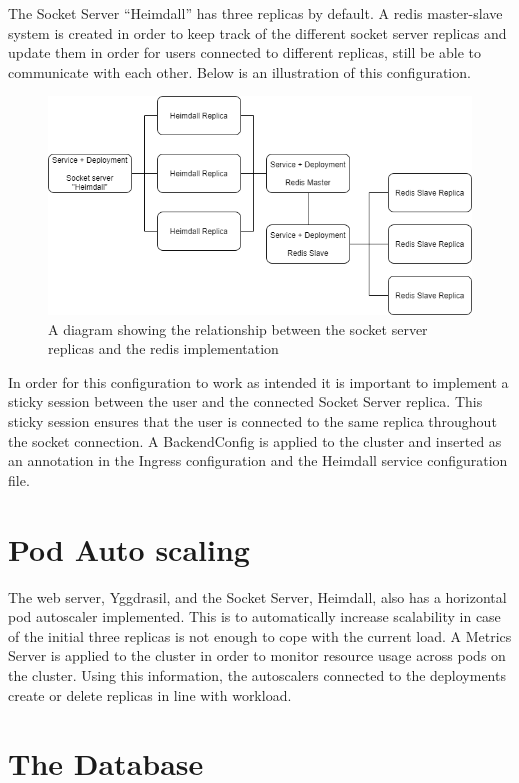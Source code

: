 The Socket Server “Heimdall” has three replicas by default. A redis master-slave system is created in order to keep track of the different socket server replicas and update them in order for users connected to different replicas, still be able to communicate with each other. Below is an illustration of this configuration. 
\begin{figure}[ht]
    \centering
    \includegraphics[width=\textwidth]{Pictures/Redis configuration.png}
    \caption{A diagram showing the relationship between the socket server replicas and the redis implementation}
    \label{fig:gantt}
\end{figure}
In order for this configuration to work as intended it is important to implement a sticky session between the user and the connected Socket Server replica. This sticky session ensures that the user is connected to the same replica throughout the socket connection. A BackendConfig is applied to the cluster and inserted as an annotation in the Ingress configuration and the Heimdall service configuration file. 

\section{Pod Auto scaling}

The web server, Yggdrasil, and the Socket Server, Heimdall, also has a horizontal pod autoscaler implemented. This is to automatically increase scalability in case of the initial three replicas is not enough to cope with the current load. A Metrics Server is applied to the cluster in order to monitor resource usage across pods on the cluster. Using this information, the autoscalers connected to the deployments create or delete replicas in line with workload.

\section{The Database}

